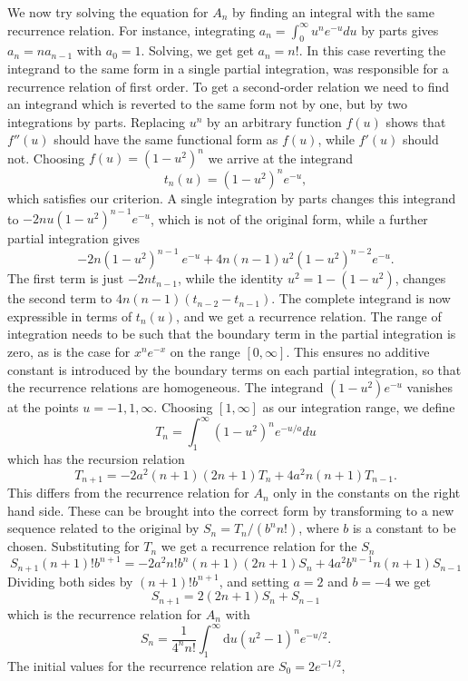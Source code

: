 \documentclass{article}
\theoremstyle{theorem}
\theoremstyle{definition}
\begin{document}
We now try solving the equation for $A_n$ by finding an integral with the same recurrence relation. For instance, integrating $ a_n = \int_0^\infty  u^n e^{-u} du $ by parts
gives $a_n = n  a_{n-1}$ with $a_0=1$. Solving, we get get $a_n = n!$. In this case reverting the integrand to the same form in a single partial integration, was responsible for a recurrence relation of first order.
To get a second-order relation we need to find an integrand which is reverted to the same form not by one, but by two integrations by parts. Replacing $u^n$ by an arbitrary function $f(u)$ shows that $f''(u)$ should have the same functional form as $f(u)$, while $f'(u)$ should not. Choosing $f(u)=(1-u^2)^n$ we arrive at the integrand 
$$t_n(u) = (1 - u^2)^n e^{-u},$$
which satisfies our criterion. A single integration by parts changes this integrand to $-2 n u (1-u^2)^{n-1}  e^{-u}$, which is not of the original form, while a further partial integration gives 
$$-2 n  (1-u^2)^{n-1}\ e^{-u} +4  n  (n-1)  u^2
(1-u^2)^{n-2} e^{-u}. $$
The first term is just $- 2nt_{n-1}$, while the identity $u^2 = 1 - (1 - u^2)$, changes the second term to $4  n (n-1)  (t_{n-2}-t_{n-1})$. The complete integrand is now expressible in terms of $t_n(u)$, and we get a recurrence relation. The range of integration needs to be such that the boundary term in the partial integration is zero, as is the case for $x^n e^{-x}$ on the range $[0, \infty]$. This ensures no additive constant is introduced by the boundary terms on each partial integration, so that the recurrence relations are homogeneous. The integrand $(1-u^2)e^{-u}$ vanishes at the points $u = {-1, 1, \infty}$. Choosing $[1, \infty]$  as our integration range, we define
$$ T_n = \int_1^\infty (1 - u^2)^n e^{-u/a} du$$
which has the recursion relation
$$T_{n+1} 	= -2 a^2 (n+1) (2n + 1) T_n + 4 a^2 n(n+1) T_{n-1}.$$
This differs from the recurrence relation for $A_n$ only in the constants on the right hand side. These can be brought into the correct form by transforming to a new sequence related to the original by $S_n = T_n/(b^n n!)$, where $b$ is a constant to be chosen. Substituting for $T_n$ we get a recurrence relation for the $S_n$
$$S_{n+1} (n+1)! b^{n+1} = -2 a^2 n! b^n (n+1) (2n + 1) S_n + 4 a^2 b^{n-1} n(n+1) S_{n-1} $$
Dividing both sides by $(n+1)! b^{n+1}$, and setting $a = 2$ and $b = -4$ we get
$$S_{n+1} = 2 (2 n + 1) S_n + S_{n-1}$$
which is the recurrence relation for $A_n$ with 
$$ S_n = \frac{1}{ 4^n n!} \int_1^\infty \textrm{d}u (u^2 - 1)^n e^{-u/2}. $$
The initial values for the recurrence relation are 
$S_0 = 2 e^{-1/2}$, 
\end{document}
